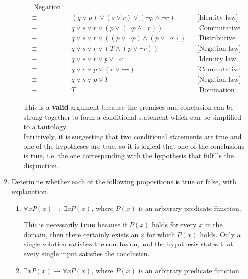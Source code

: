 \documentclass[letterpaper, 12pt]{article}
\newcommand{\then}{\rightarrow}
\begin{document}
\begin{enumerate}
\begin{enumerate}
\begin{align*}
    &\text{[Negation law]} \\
    &\equiv & (q \vee p) \vee (s \vee r) \vee (\neg p \wedge \neg r) & 
    &\text{[Identity law]} \\
    &\equiv & q \vee s \vee r \vee (p \vee (\neg p \wedge \neg r)) & 
    &\text{[Commutative law]} \\
    &\equiv & q \vee s \vee r \vee ((p \vee \neg p) \wedge (p \vee \neg r)) & 
    &\text{[Distributive law]} \\
    &\equiv & q \vee s \vee r \vee (T \wedge (p \vee \neg r)) & 
    &\text{[Negation law]} \\
    &\equiv & q \vee s \vee r \vee p \vee \neg r & 
    &\text{[Identity law]} \\
    &\equiv & q \vee s \vee p \vee (r \vee \neg r) & 
    &\text{[Commutative law]} \\
    &\equiv & q \vee s \vee p \vee T & 
    &\text{[Negation law]} \\
    &\equiv & T & 
    &\text{[Domination law]}
\end{align*}
\begin{flushleft}
    This is a \textbf{valid} argument because the premises and conclusion can be strung together 
    to form a conditional statement which can be simplified to a tautology. \\
    Intuitively, it is suggesting that two conditional statements are true and one of the 
    hypotheses are true, so it is logical that one of the conclusions is true, i.e. the one 
    corresponding with the hypothesis that fulfills the disjunction.
\end{flushleft}
\end{enumerate}
\pagebreak
\item Determine whether each of the following propositions is true or false, with explanation.
\begin{enumerate}
\item $\forall x P(x) \then \exists x P(x)$, where $P(x)$ is an arbitrary predicate function.
\begin{flushleft}
    This is necessarily \textbf{true} because if $P(x)$ holds for every $x$ in the domain, then 
    there certainly exists an $x$ for which $P(x)$ holds. Only a single solution satisfies the
    conclusion, and the hypothesis states that every single input satisfies the conclusion.
\end{flushleft}
\item $\exists x P(x) \then \forall x P(x)$, where $P(x)$ is an arbitrary predicate function.

\end{enumerate}
\end{enumerate}
\end{document}
